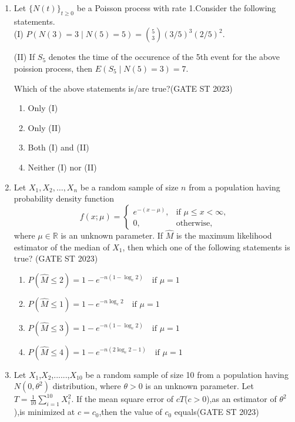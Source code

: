 \documentclass[journal]{IEEEtran}
\begin{document}
\begin{enumerate}[label=\textbf{Q.\arabic*.}, start=11, align=left, itemsep=2em]
\item Let $\{N(t)\}_{t\ge0}$ be a Poisson process with rate 1.Consider the following statements.\\

(I) $P(N(3)=3 \mid N(5)=5) = {5\choose3} (3/5)^3 (2/5)^2$.  

(II) If $S_5$ denotes the time of the occurence of the 5th event for the above poission process, then $E(S_5 \mid N(5)=3) = 7$.

Which of the above statements is/are true?\hfill(GATE ST 2023)
\begin{enumerate}
\item Only (I)
\item Only (II)
\item Both (I) and (II)
\item Neither (I) nor (II)
\end{enumerate}

\item Let $X_1, X_2, \dots, X_n$ be a random sample of size $n$ from a population having 
probability density function  
\[
f(x; \mu) = 
\begin{cases} 
e^{-(x-\mu)}, & \text{if } \mu \le x < \infty, \\
0, & \text{otherwise},
\end{cases}
\]
where $\mu \in \mathbb{R}$ is an unknown parameter.  
If $\hat{M}$ is the maximum likelihood estimator of the median of $X_1$,  
then which one of the following statements is true?  \hfill(GATE ST 2023)

\begin{enumerate}
    \item $P(\hat{M} \le 2) = 1 - e^{-n(1 - \log_e 2)} \quad \text{if } \mu = 1$
    \item $P(\hat{M} \le 1) = 1 - e^{-n \log_e 2} \quad \text{if } \mu = 1$
    \item $P(\hat{M} \le 3) = 1 - e^{-n(1 - \log_e 2)} \quad \text{if } \mu = 1$
    \item $P(\hat{M} \le 4) = 1 - e^{-n(2\log_e 2 - 1)} \quad \text{if } \mu = 1$
\end{enumerate}


\item Let $X_1$,$X_2$,......,$X_10$ be a random sample of size 10 from a population having $N(0,\theta^2)$ distribution, where $\theta >0$ is an unknown parameter. 
Let $T = \frac1{10} \sum_{i=1}^{10} X_i^2$. If the mean square error of $cT$($c>0$),as an estimator of $\theta^2$),is minimized at $c=c_0$,then the value of $c_0$ equals\hfill(GATE ST 2023)


\end{enumerate}
\end{document}
